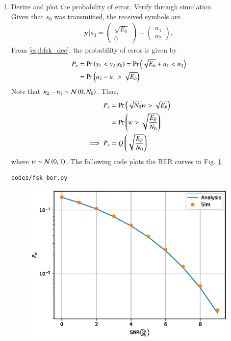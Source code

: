 \documentclass[journal,12pt,twocolumn]{IEEEtran}
\renewcommand\thesection{\arabic{section}}
\begin{document}
\begin{enumerate}[label=\thesection.\arabic*.,ref=\thesection.\theenumi]
\item
Derive and plot the probability of error.  Verify through simulation.
\\
\solution Given that $s_0$ was transmitted, the received symbols are
\begin{align}
\mathbf{y}|s_0 = 
\begin{pmatrix*}
\sqrt{E_b} \\
0
\end{pmatrix*}
+
\begin{pmatrix*}
 n_{1}\\
n_{2}
\end{pmatrix*},
\end{align}
From \eqref{eq:bfsk_dec}, 
the probability of error is given by
\begin{align}
P_e &= \Pr\left(y_1 < y_2|s_0\right) = \Pr\left(\sqrt{E_b} + n_1 < n_2\right)
\\
&= \Pr\left( n_2-n_1 > \sqrt{E_b} \right) 
\label{eq:bfsk_proof_n0}
\end{align}
Note that $n_2-n_1 \sim \mathcal{N}\left(0,N_0\right)$. Thus, 
\begin{align}
P_e &= \Pr\left( \sqrt{N_0}w > \sqrt{E_b} \right)  
\\
&=  \Pr\left( w > \sqrt{\frac{E_b}{N_0}} \right)
\\
\implies 
P_e & = Q\left(\sqrt{\frac{E_b}{N_0}}\right)
\end{align}
where 
$w \sim \mathcal{N}\left(0,1\right)$.  
%
The following code plots the BER curves in Fig. \ref{fig:ee18btech11042_bfsk_ber}
\begin{lstlisting}
codes/fsk_ber.py
\end{lstlisting}
%
\begin{figure}[!ht]
\centering
\includegraphics[width=\columnwidth]{./figs/bfsk_ber.eps}
\caption{}
\label{fig:ee18btech11042_bfsk_ber}
\end{figure}

\end{enumerate}
\end{document}
